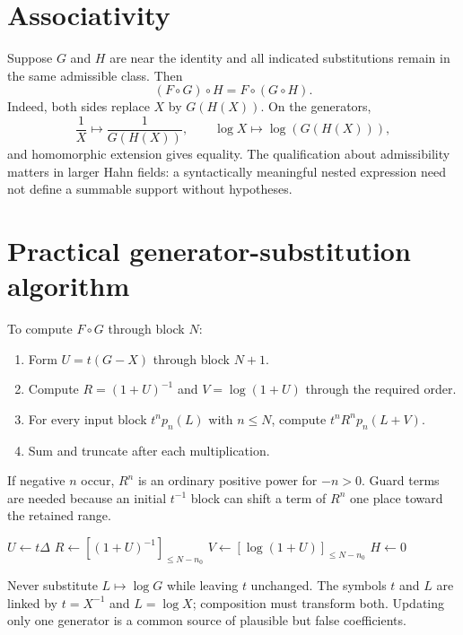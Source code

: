 \documentclass[11pt,oneside]{book}
\theoremstyle{definition}
\theoremstyle{remark}
\newcommand{\compose}{\mathbin{\circ}}
\newcommand{\trunc}[2]{\left[#1\right]_{\le #2}}
\begin{document}
\section{Associativity}
Suppose $G$ and $H$ are near the identity and all indicated substitutions
remain in the same admissible class.  Then
\begin{equation}\label{eq:composition-associativity}
 (F\compose G)\compose H=F\compose(G\compose H).
\end{equation}
Indeed, both sides replace $X$ by $G(H(X))$.  On the generators,
\[
 \frac1X\mapsto\frac1{G(H(X))},
 \qquad
 \log X\mapsto\log(G(H(X))),
\]
and homomorphic extension gives equality.  The qualification about
admissibility matters in larger Hahn fields: a syntactically meaningful
nested expression need not define a summable support without hypotheses.

\section{Practical generator-substitution algorithm}
To compute $F\compose G$ through block $N$:
\begin{enumerate}
\item Form $U=t(G-X)$ through block $N+1$.
\item Compute $R=(1+U)^{-1}$ and $V=\log(1+U)$ through the required order.
\item For every input block $t^np_n(L)$ with $n\le N$, compute
      $t^nR^np_n(L+V)$.
\item Sum and truncate after each multiplication.
\end{enumerate}
If negative $n$ occur, $R^n$ is an ordinary positive power for $-n>0$.
Guard terms are needed because an initial $t^{-1}$ block can shift a term of
$R^n$ one place toward the retained range.

\begin{algorithm}[H]
\caption{Near-identity composition through outer block $N$}
\label{alg:generator-composition}
\KwOut{$\trunc{F\compose G}{N}$}
$U\leftarrow t\Delta$\;
$R\leftarrow\trunc{(1+U)^{-1}}{N-n_0}$\;
$V\leftarrow\trunc{\log(1+U)}{N-n_0}$\;
$H\leftarrow0$\;
\For{$n\leftarrow n_0$ \KwTo $N$}{
  $H\leftarrow H+t^nR^np_n(L+V)$\;
  $H\leftarrow\trunc{H}{N}$\;
}
\;
\end{algorithm}

\begin{pitfallbox}
Never substitute $L\mapsto\log G$ while leaving $t$ unchanged.  The symbols
$t$ and $L$ are linked by $t=X^{-1}$ and $L=\log X$; composition must transform
both.  Updating only one generator is a common source of plausible but false
coefficients.
\end{pitfallbox}
\end{document}
